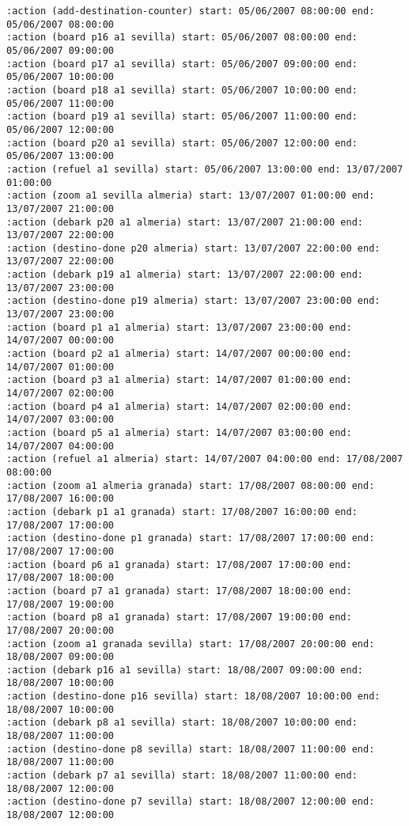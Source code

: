 \documentclass{article}
\begin{document}
\begin{lstlisting}
:action (add-destination-counter) start: 05/06/2007 08:00:00 end: 05/06/2007 08:00:00
:action (board p16 a1 sevilla) start: 05/06/2007 08:00:00 end: 05/06/2007 09:00:00
:action (board p17 a1 sevilla) start: 05/06/2007 09:00:00 end: 05/06/2007 10:00:00
:action (board p18 a1 sevilla) start: 05/06/2007 10:00:00 end: 05/06/2007 11:00:00
:action (board p19 a1 sevilla) start: 05/06/2007 11:00:00 end: 05/06/2007 12:00:00
:action (board p20 a1 sevilla) start: 05/06/2007 12:00:00 end: 05/06/2007 13:00:00
:action (refuel a1 sevilla) start: 05/06/2007 13:00:00 end: 13/07/2007 01:00:00
:action (zoom a1 sevilla almeria) start: 13/07/2007 01:00:00 end: 13/07/2007 21:00:00
:action (debark p20 a1 almeria) start: 13/07/2007 21:00:00 end: 13/07/2007 22:00:00
:action (destino-done p20 almeria) start: 13/07/2007 22:00:00 end: 13/07/2007 22:00:00
:action (debark p19 a1 almeria) start: 13/07/2007 22:00:00 end: 13/07/2007 23:00:00
:action (destino-done p19 almeria) start: 13/07/2007 23:00:00 end: 13/07/2007 23:00:00
:action (board p1 a1 almeria) start: 13/07/2007 23:00:00 end: 14/07/2007 00:00:00
:action (board p2 a1 almeria) start: 14/07/2007 00:00:00 end: 14/07/2007 01:00:00
:action (board p3 a1 almeria) start: 14/07/2007 01:00:00 end: 14/07/2007 02:00:00
:action (board p4 a1 almeria) start: 14/07/2007 02:00:00 end: 14/07/2007 03:00:00
:action (board p5 a1 almeria) start: 14/07/2007 03:00:00 end: 14/07/2007 04:00:00
:action (refuel a1 almeria) start: 14/07/2007 04:00:00 end: 17/08/2007 08:00:00
:action (zoom a1 almeria granada) start: 17/08/2007 08:00:00 end: 17/08/2007 16:00:00
:action (debark p1 a1 granada) start: 17/08/2007 16:00:00 end: 17/08/2007 17:00:00
:action (destino-done p1 granada) start: 17/08/2007 17:00:00 end: 17/08/2007 17:00:00
:action (board p6 a1 granada) start: 17/08/2007 17:00:00 end: 17/08/2007 18:00:00
:action (board p7 a1 granada) start: 17/08/2007 18:00:00 end: 17/08/2007 19:00:00
:action (board p8 a1 granada) start: 17/08/2007 19:00:00 end: 17/08/2007 20:00:00
:action (zoom a1 granada sevilla) start: 17/08/2007 20:00:00 end: 18/08/2007 09:00:00
:action (debark p16 a1 sevilla) start: 18/08/2007 09:00:00 end: 18/08/2007 10:00:00
:action (destino-done p16 sevilla) start: 18/08/2007 10:00:00 end: 18/08/2007 10:00:00
:action (debark p8 a1 sevilla) start: 18/08/2007 10:00:00 end: 18/08/2007 11:00:00
:action (destino-done p8 sevilla) start: 18/08/2007 11:00:00 end: 18/08/2007 11:00:00
:action (debark p7 a1 sevilla) start: 18/08/2007 11:00:00 end: 18/08/2007 12:00:00
:action (destino-done p7 sevilla) start: 18/08/2007 12:00:00 end: 18/08/2007 12:00:00

\end{lstlisting}
\end{document}
